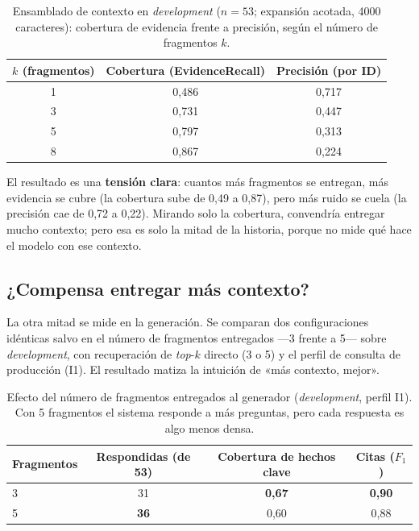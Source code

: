 \begin{table}[htbp]
    \centering
    \small
    \renewcommand{\arraystretch}{1.2}
    \caption{Ensamblado de contexto en \emph{development} ($n=53$; expansión acotada, 4000 caracteres): cobertura de evidencia frente a precisión, según el número de fragmentos $k$.}
    \label{tab:l2-ctxabl}
    \begin{tabular}{|c|c|c|}
        \hline
        \textbf{$k$ (fragmentos)} & \textbf{Cobertura (EvidenceRecall)} & \textbf{Precisión (por ID)} \\
        \hline
        1 & 0,486 & 0,717 \\
        3 & 0,731 & 0,447 \\
        5 & 0,797 & 0,313 \\
        8 & 0,867 & 0,224 \\
        \hline
    \end{tabular}
\end{table}

El resultado es una \textbf{tensión clara}: cuantos más fragmentos se entregan, más evidencia se cubre (la cobertura sube de 0,49 a 0,87), pero más ruido se cuela (la precisión cae de 0,72 a 0,22). Mirando solo la cobertura, convendría entregar mucho contexto; pero esa es solo la mitad de la historia, porque no mide qué hace el modelo con ese contexto.

\subsection{¿Compensa entregar más contexto?}
\label{subsec:l2-generacion}

La otra mitad se mide en la generación. Se comparan dos configuraciones idénticas salvo en el número de fragmentos entregados —3 frente a 5— sobre \emph{development}, con recuperación de \emph{top}-$k$ directo (3 o 5) y el perfil de consulta de producción (I1). El resultado matiza la intuición de «más contexto, mejor».

\begin{table}[htbp]
    \centering
    \small
    \renewcommand{\arraystretch}{1.2}
    \caption{Efecto del número de fragmentos entregados al generador (\emph{development}, perfil I1). Con 5 fragmentos el sistema responde a más preguntas, pero cada respuesta es algo menos densa.}
    \label{tab:l2-3v5}
    \begin{tabular}{|l|c|c|c|}
        \hline
        \textbf{Fragmentos} & \textbf{Respondidas (de 53)} & \textbf{Cobertura de hechos clave} & \textbf{Citas ($F_1$)} \\
        \hline
        3 & 31 & \textbf{0,67} & \textbf{0,90} \\
        5 & \textbf{36} & 0,60 & 0,88 \\
        \hline
    \end{tabular}
\end{table}

